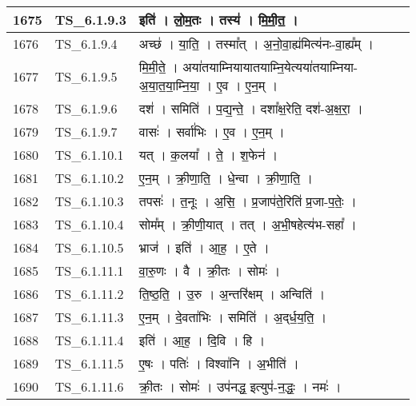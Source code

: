 \documentclass[17pt]{extarticle}
\begin{document}
\begin{longtable}{||p{0.4in}||p{0.9in}||p{4.0in}||p{0.9in}||}
        \hline
            1675 & TS\_6.1.9.3 & इति॑   ।   लो॒म॒तः   ।   तस्य॑   ।   मि॒मी॒त॒   ।    &      \\
        \hline
            1676 & TS\_6.1.9.4 & अच्छ॑   ।   या॒ति॒   ।   तस्मा᳚त्   ।   अ॒नो॒वा॒ह्य॑मित्य॑नः{-}वा॒ह्य᳚म्   ।    &      \\
        \hline
            1677 & TS\_6.1.9.5 & मि॒मी॒ते॒   ।   अया॑तयाम्नियायातयाम्नि॒येत्यया॑तयाम्निया{-}अ॒या॒त॒या॒म्नि॒या॒   ।   ए॒व   ।   ए॒न॒म्   ।    &      \\
        \hline
            1678 & TS\_6.1.9.6 & दश॑   ।   समिति॑   ।   प॒द्य॒न्ते॒   ।   दशा᳚क्ष॒रेति॒ दश॑{-}अ॒क्ष॒रा॒   ।    &      \\
        \hline
            1679 & TS\_6.1.9.7 & वासः॑   ।   सर्वा॑भिः   ।   ए॒व   ।   ए॒न॒म्   ।    &      \\
        \hline
            1680 & TS\_6.1.10.1 & यत्   ।   क॒लया᳚   ।   ते॒   ।   श॒फेन॑   ।    &      \\
        \hline
            1681 & TS\_6.1.10.2 & ए॒न॒म्   ।   क्री॒णा॒ति॒   ।   धे॒न्वा   ।   क्री॒णा॒ति॒   ।    &      \\
        \hline
            1682 & TS\_6.1.10.3 & तपसः॑   ।   त॒नूः   ।   अ॒सि॒   ।   प्र॒जाप॑ते॒रिति॑ प्र॒जा{-}प॒तेः॒   ।    &      \\
        \hline
            1683 & TS\_6.1.10.4 & सोम᳚म्   ।   क्री॒णी॒यात्   ।   तत्   ।   अ॒भी॒षहेत्य॑भ{-}सहा᳚   ।    &      \\
        \hline
            1684 & TS\_6.1.10.5 & भ्राज॑   ।   इति॑   ।   आ॒ह॒   ।   ए॒ते   ।    &      \\
        \hline
            1685 & TS\_6.1.11.1 & वा॒रु॒णः   ।   वै   ।   क्री॒तः   ।   सोमः॑   ।    &      \\
        \hline
            1686 & TS\_6.1.11.2 & ति॒ष्ठ॒ति॒   ।   उ॒रु   ।   अ॒न्तरि॑क्षम्   ।   अन्विति॑   ।    &      \\
        \hline
            1687 & TS\_6.1.11.3 & ए॒न॒म्   ।   दे॒वता॑भिः   ।   समिति॑   ।   अ॒द्‌र्ध॒य॒ति॒   ।    &      \\
        \hline
            1688 & TS\_6.1.11.4 & इति॑   ।   आ॒ह॒   ।   दि॒वि   ।   हि   ।    &      \\
        \hline
            1689 & TS\_6.1.11.5 & ए॒षः   ।   पतिः॑   ।   विश्वा॑नि   ।   अ॒भीति॑   ।    &      \\
        \hline
            1690 & TS\_6.1.11.6 & क्री॒तः   ।   सोमः॑   ।   उप॑नद्ध॒ इत्युप॑{-}न॒द्धः॒   ।   नमः॑   ।    &      \\

\end{longtable}
\end{document}
